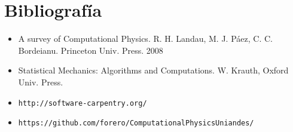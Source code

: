 \documentclass[12pt]{article}
\begin{document}
\section*{Bibliograf\'ia}
\begin{itemize}
\item
A survey of Computational Physics. R. H. Landau, M. J. P\'aez, C. C.
Bordeianu. Princeton Univ. Press. 2008 
\item
Statistical Mechanics: Algorithms and Computations. W. Krauth, Oxford Univ. Press. 
\item\verb"http://software-carpentry.org/"
\item\verb"https://github.com/forero/ComputationalPhysicsUniandes/"
\end{itemize}

 
\end{document}
